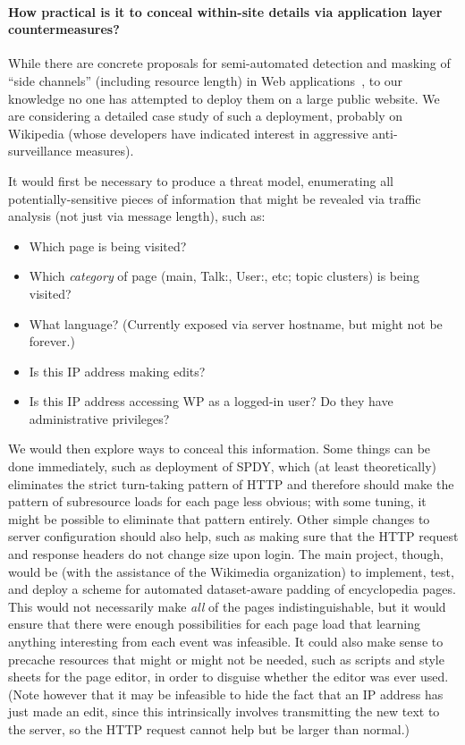 \documentclass[oneside]{zarticle}
\begin{document}
\paragraph{How practical is it to conceal within-site details via
  application layer countermeasures?} While there are concrete
proposals for semi-automated detection and masking of “side channels”
(including resource length) in Web
applications~\cite{backes2013sidechannel, chapman2011automated,
  zhang2010sidebuster}, to our knowledge no one has attempted to
deploy them on a large public website.  We are considering a detailed
case study of such a deployment, probably on Wikipedia (whose
developers have indicated interest in aggressive anti-surveillance
measures).

It would first be necessary to produce a threat model, enumerating all
potentially-sensitive pieces of information that might be revealed via
traffic analysis (not just via message length), such as:

\begin{itemize}
\item Which page is being visited?
\item Which \emph{category} of page (main, Talk:, User:, etc; topic
  clusters) is being visited?
\item What language? (Currently exposed via server hostname, but might
  not be forever.)
\item Is this IP address making edits?
\item Is this IP address accessing WP as a logged-in user? Do they
  have administrative privileges?
\end{itemize}

We would then explore ways to conceal this information.  Some things
can be done immediately, such as deployment of SPDY, which (at least
theoretically) eliminates the strict turn-taking pattern of HTTP and
therefore should make the pattern of subresource loads for each page
less obvious; with some tuning, it might be possible to eliminate that
pattern entirely.  Other simple changes to server configuration should
also help, such as making sure that the HTTP request and response
headers do not change size upon login.  The main project, though,
would be (with the assistance of the Wikimedia organization) to
implement, test, and deploy a scheme for automated dataset-aware
padding of encyclopedia pages.  This would not necessarily make
\emph{all} of the pages indistinguishable, but it would ensure that
there were enough possibilities for each page load that learning
anything interesting from each event was infeasible.  It could also
make sense to precache resources that might or might not be needed,
such as scripts and style sheets for the page editor, in order to
disguise whether the editor was ever used.  (Note however that it may
be infeasible to hide the fact that an IP address has just made an
edit, since this intrinsically involves transmitting the new text to
the server, so the HTTP request cannot help but be larger than
normal.)
\end{document}
